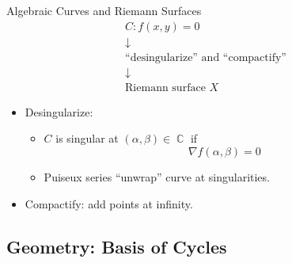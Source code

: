 \documentclass{beamer}
\DeclareMathOperator{\CC}{\mathbb{C}}
\begin{document}
\begin{frame}{Algebraic Curves and Riemann Surfaces}{}
  \begin{gather*}
    C : f(x,y) = 0 \\
    \downarrow     \\
    \text{``desingularize'' and ``compactify''} \\
    \downarrow     \\
    \text{Riemann surface } X
  \end{gather*}

  \begin{itemize}
    \item Desingularize:
      \begin{itemize}
        \item $C$ is singular at $(\alpha,\beta) \in \CC$ if
          \[
          \nabla f (\alpha, \beta) = 0
          \]
        \item Puiseux series ``unwrap'' curve at singularities.
      \end{itemize}
    \item Compactify: add points at infinity. %
  \end{itemize}
\end{frame}






\subsection{Geometry: Basis of Cycles}
\end{document}

